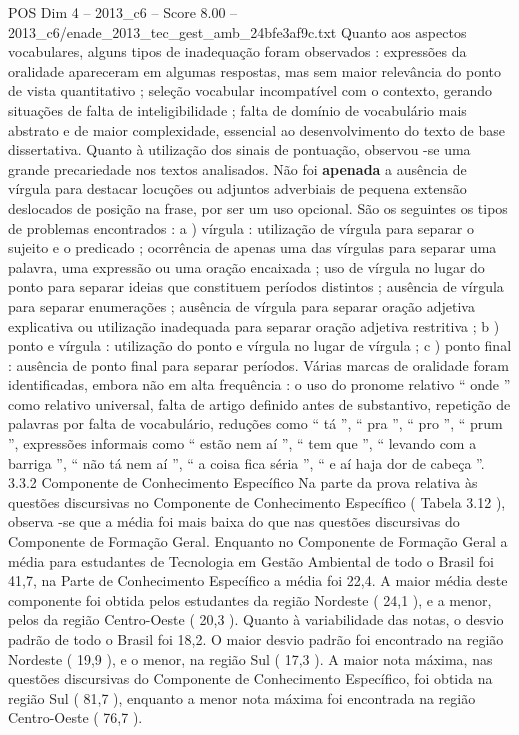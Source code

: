\begin{textsample}{POS Dim 4 – 2013\_c6 – Score 8.00 – 2013\_c6/enade\_2013\_tec\_gest\_amb\_24bfe3af9c.txt}
Quanto aos aspectos vocabulares, alguns tipos de inadequação foram observados : expressões da oralidade apareceram em algumas respostas, mas sem maior relevância do ponto de vista quantitativo ; seleção vocabular incompatível com o contexto, gerando situações de falta de inteligibilidade ; falta de domínio de vocabulário mais abstrato e de maior complexidade, essencial ao desenvolvimento do texto de base dissertativa.
Quanto à utilização dos sinais de pontuação, observou -se uma grande precariedade nos textos analisados.
Não foi \textbf{apenada} a ausência de vírgula para destacar locuções ou adjuntos adverbiais de pequena extensão deslocados de posição na frase, por ser um uso opcional.
São os seguintes os tipos de problemas encontrados : a ) vírgula : utilização de vírgula para separar o sujeito e o predicado ; ocorrência de apenas uma das vírgulas para separar uma palavra, uma expressão ou uma oração encaixada ; uso de vírgula no lugar do ponto para separar ideias que constituem períodos distintos ; ausência de vírgula para separar enumerações ; ausência de vírgula para separar oração adjetiva explicativa ou utilização inadequada para separar oração adjetiva restritiva ; b ) ponto e vírgula : utilização do ponto e vírgula no lugar de vírgula ; c ) ponto final : ausência de ponto final para separar períodos.
Várias marcas de oralidade foram identificadas, embora não em alta frequência : o uso do pronome relativo “ onde ” como relativo universal, falta de artigo definido antes de substantivo, repetição de palavras por falta de vocabulário, reduções como “ tá ”, “ pra ”, “ pro ”, “ prum ”, expressões informais como “ estão nem aí ”, “ tem que ”, “ levando com a barriga ”, “ não tá nem aí ”, “ a coisa fica séria ”, “ e aí haja dor de cabeça ”. 3.3.2 Componente de Conhecimento Específico Na parte da prova relativa às questões discursivas no Componente de Conhecimento Específico ( Tabela 3.12 ), observa -se que a média foi mais baixa do que nas questões discursivas do Componente de Formação Geral.
Enquanto no Componente de Formação Geral a média para estudantes de Tecnologia em Gestão Ambiental de todo o Brasil foi 41,7, na Parte de Conhecimento Específico a média foi 22,4.
A maior média deste componente foi obtida pelos estudantes da região Nordeste ( 24,1 ), e a menor, pelos da região Centro-Oeste ( 20,3 ).
Quanto à variabilidade das notas, o desvio padrão de todo o Brasil foi 18,2.
O maior desvio padrão foi encontrado na região Nordeste ( 19,9 ), e o menor, na região Sul ( 17,3 ).
A maior nota máxima, nas questões discursivas do Componente de Conhecimento Específico, foi obtida na região Sul ( 81,7 ), enquanto a menor nota máxima foi encontrada na região Centro-Oeste ( 76,7 ).

\end{textsample}
